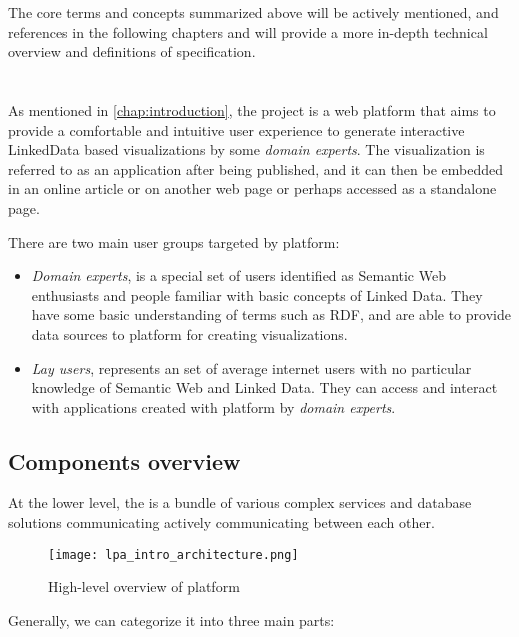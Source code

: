 The core terms and concepts summarized above will be actively mentioned, and references in the following chapters and will provide a more in-depth technical overview and definitions of \solid{} specification. 

\section{\lpa{}}

As mentioned in \autoref{chap:introduction}, the \lpa{} project is a web platform that aims to provide a comfortable and intuitive user experience to generate interactive LinkedData based visualizations by some \textit{domain experts}. The visualization is referred to as an application after being published, and it can then be embedded in an online article or on another web page or perhaps accessed as a standalone page. 

There are two main user groups targeted by \lpa{} platform:
\begin{itemize}
	\item \textit{Domain experts}, is a special set of users identified as Semantic Web enthusiasts and people familiar with basic concepts of Linked Data. They have some basic understanding of terms such as RDF, and are able to provide data sources to \lpa{} platform for creating visualizations.
	\item \textit{Lay users}, represents an set of average internet users with no particular knowledge of Semantic Web and Linked Data. They can access and interact with applications created with \lpa{} platform by \textit{domain experts}.
\end{itemize}

\subsection{Components overview}

At the lower level, the \lpa{} is a bundle of various complex services and database solutions communicating actively communicating between each other. 

\begin{figure}[h]
    \centering
    \texttt{[image: lpa\_intro\_architecture.png]}
    \caption{High-level overview of \lpa{} platform}
    \label{fig:lpa_intro_architecture}
\end{figure}

Generally, we can categorize it into three main parts: 


